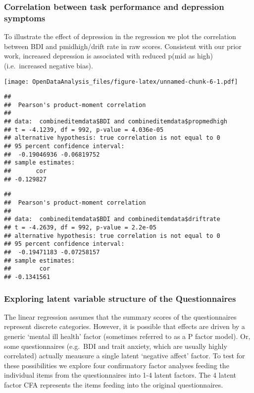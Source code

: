 \documentclass[]{article}
\begin{document}
\subsubsection{Correlation between task performance and depression
symptoms}\label{correlation-between-task-performance-and-depression-symptoms}

To illustrate the effect of depression in the regression we plot the
correlation between BDI and pmidhigh/drift rate in raw scores.
Consistent with our prior work, increased depression is associated with
reduced p(mid as high)(i.e.~increased negative bias).

\texttt{[image: OpenDataAnalysis\_files/figure-latex/unnamed-chunk-6-1.pdf]}

\begin{verbatim}
## 
##  Pearson's product-moment correlation
## 
## data:  combineditemdata$BDI and combineditemdata$propmedhigh
## t = -4.1239, df = 992, p-value = 4.036e-05
## alternative hypothesis: true correlation is not equal to 0
## 95 percent confidence interval:
##  -0.19046936 -0.06819752
## sample estimates:
##       cor 
## -0.129827
\end{verbatim}

\begin{verbatim}
## 
##  Pearson's product-moment correlation
## 
## data:  combineditemdata$BDI and combineditemdata$driftrate
## t = -4.2639, df = 992, p-value = 2.2e-05
## alternative hypothesis: true correlation is not equal to 0
## 95 percent confidence interval:
##  -0.19471183 -0.07258157
## sample estimates:
##        cor 
## -0.1341561
\end{verbatim}

\subsubsection{Exploring latent variable structure of the
Questionnaires}\label{exploring-latent-variable-structure-of-the-questionnaires}

The linear regression assumes that the summary scores of the
questionnaires represent discrete categories. However, it is possible
that effects are driven by a generic `mental ill health' factor
(sometimes referred to as a P factor model). Or, some questionnaires
(e.g.~BDI and trait anxiety, which are usually highly correlated)
actually meausure a single latent `negative affect' factor. To test for
these possibilities we explore four confirmatory factor analyses feeding
the individual items from the questionnaires into 1-4 latent factors.
The 4 latent factor CFA represents the items feeding into the original
questionnaires.
\end{document}
